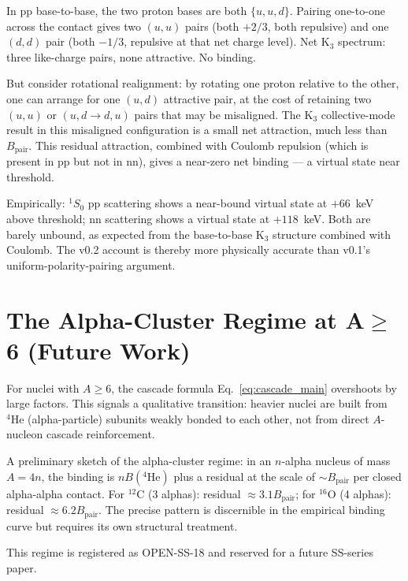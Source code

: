 \documentclass[11pt,letterpaper]{article}
\newcommand{\Bpair}{B_{\mathrm{pair}}}
\begin{document}
In pp base-to-base, the two proton bases are both $\{u,u,d\}$. Pairing one-to-one across the contact gives two $(u,u)$ pairs (both $+2/3$, both repulsive) and one $(d,d)$ pair (both $-1/3$, repulsive at that net charge level). Net K$_3$ spectrum: three like-charge pairs, none attractive. No binding.

But consider rotational realignment: by rotating one proton relative to the other, one can arrange for one $(u,d)$ attractive pair, at the cost of retaining two $(u,u)$ or $(u,d \to d,u)$ pairs that may be misaligned. The K$_3$ collective-mode result in this misaligned configuration is a small net attraction, much less than $\Bpair$. This residual attraction, combined with Coulomb repulsion (which is present in pp but not in nn), gives a near-zero net binding --- a virtual state near threshold.

Empirically: ${}^{1}S_{0}$ pp scattering shows a near-bound virtual state at $+66$~keV above threshold; nn scattering shows a virtual state at $+118$~keV. Both are barely unbound, as expected from the base-to-base K$_3$ structure combined with Coulomb. The v0.2 account is thereby more physically accurate than v0.1's uniform-polarity-pairing argument.

\section{The Alpha-Cluster Regime at A$\geq$6 (Future Work)}
\label{sec:alpha_clusters}

For nuclei with $A \geq 6$, the cascade formula Eq.~\eqref{eq:cascade_main} overshoots by large factors. This signals a qualitative transition: heavier nuclei are built from ${}^{4}\mathrm{He}$ (alpha-particle) subunits weakly bonded to each other, not from direct $A$-nucleon cascade reinforcement.

A preliminary sketch of the alpha-cluster regime: in an $n$-alpha nucleus of mass $A = 4n$, the binding is $n B({}^{4}\mathrm{He})$ plus a residual at the scale of $\sim \Bpair$ per closed alpha-alpha contact. For ${}^{12}\mathrm{C}$ (3 alphas): residual $\approx 3.1 \Bpair$; for ${}^{16}\mathrm{O}$ (4 alphas): residual $\approx 6.2 \Bpair$. The precise pattern is discernible in the empirical binding curve but requires its own structural treatment.

This regime is registered as OPEN-SS-18 and reserved for a future SS-series paper.
\end{document}
